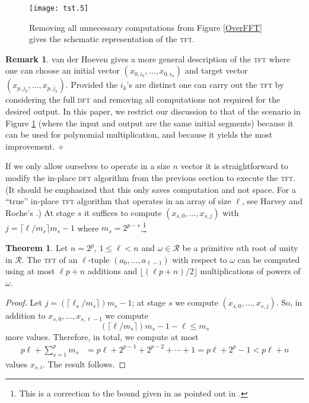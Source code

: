 \documentclass[12pt]{article}
\theoremstyle{definition}
\newcommand{\0}{\mathbf{0}}
\theoremstyle{theorem}
\newtheorem{theorem}{Theorem}
\theoremstyle{definition}
\newtheorem*{remark}{Remark}
\newcommand{\RR}{\mathcal{R}}
\newcommand{\w}{\omega}
\begin{document}
\begin{figure}[htbp]
\begin{center}
\texttt{[image: tst.5]}
\caption{Removing all unnecessary computations from Figure \ref{OverFFT} gives the schematic representation of the \textsc{tft}.}
\label{TFT0}
\end{center}
\end{figure}

\begin{remark}
van der Hoeven \cite{TFT2} gives a more general description of the \textsc{tft} where one can choose an initial vector $(x_{0,i_0}, \ldots, x_{0,i_n})$ and target vector $(x_{p,j_0}, \ldots, x_{p,j_n})$. Provided the $i_k$'s are distinct one can carry out the \textsc{tft} by considering the full \textsc{dft} and removing all computations not required for the desired output. In this paper, we restrict our discussion to that of the scenario in Figure \ref{TFT0} (where the input and output are the same initial segments) because it can be used for polynomial multiplication, and because it yields the most improvement. $\diamond$
\end{remark}

If we only allow ourselves to operate in a size $n$ vector it is straightforward to modify the in-place \textsc{dft} algorithm from the previous section to execute the \textsc{tft}. (It should be emphasized that this only saves computation and not space. For a ``true'' in-place \textsc{tft} algorithm that operates in an array of size $\ell$, see Harvey and Roche's \cite{InPlaceTFT}.) At stage $s$ it suffices to compute 
$(x_{s,0}, \ldots, x_{s,j})$ with $j=\lceil \ell/m_s \rceil m_s-1$ where $m_s = 2^{p-s}$.\footnote{This is a correction to the bound given in \cite{TFT1} as pointed out in \cite{TFT2}.}

\begin{theorem}
Let $n=2^p$, $1 \leq \ell < n$ and $\w \in \RR$ be a primitive $n$th root of unity in $\RR$. The \textsc{tft} of an $\ell$-tuple $(a_0, \ldots, a_{\ell-1})$ with respect to $\w$ can be computed using at most $\ell p + n$ additions and $\lfloor (\ell p + n)/2 \rfloor$ multiplications of powers of $\w$.
\end{theorem}

\begin{proof}
Let $j=(\lceil \ell_s/m_s \rceil)m_s-1$; at stage $s$ we compute $(x_{s,0}, \ldots, x_{s,j})$. So, in addition to $x_{s,0}, \ldots, x_{s,\ell-1}$ we compute $$(\lceil \ell/m_s \rceil)m_s -1 - \ell \leq m_s$$ more values. Therefore, in total, we compute at most 
\begin{align*}
p\ell + \sum_{s=1}^{p} {m_s} 
&= p \ell + 2^{p-1} + 2^{p-2} + \cdots + 1 = p\ell + 2^p - 1 < p \ell + n
\end{align*}
values $x_{s,i}$. The result follows.
\end{proof}
\end{document}
